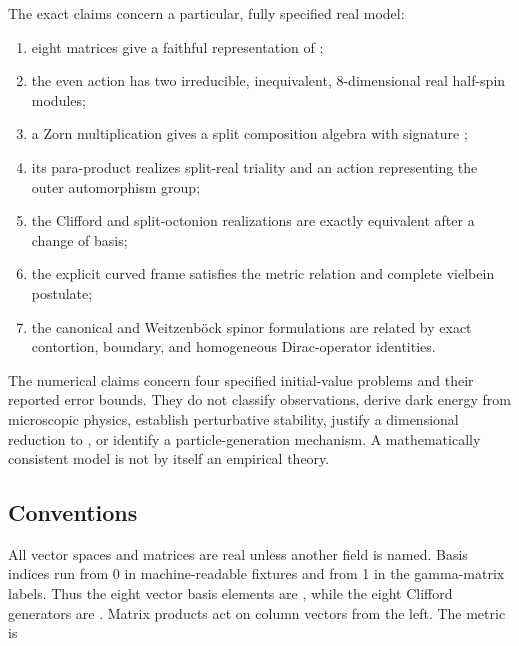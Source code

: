 \documentclass[11pt]{article}
\begin{document}
The exact claims concern a particular, fully specified real model:

\begin{enumerate}
\item eight matrices give a faithful representation of \texttt{};
\item the even action has two irreducible, inequivalent, 8-dimensional real
half-spin modules;

\item a Zorn multiplication gives a split composition algebra with signature
\texttt{};

\item its para-product realizes split-real triality and an \texttt{} action
representing the outer automorphism group;

\item the Clifford and split-octonion realizations are exactly equivalent after a
change of basis;

\item the explicit curved frame satisfies the metric relation and complete
vielbein postulate;

\item the canonical and Weitzenböck spinor formulations are related by exact
contortion, boundary, and homogeneous Dirac-operator identities.

\end{enumerate}

The numerical claims concern four specified initial-value problems and their reported error bounds. They do not classify observations, derive dark energy from microscopic physics, establish perturbative stability, justify a dimensional reduction to \texttt{}, or identify a particle-generation mechanism. A mathematically consistent model is not by itself an empirical theory.

\subsection{Conventions}

All vector spaces and matrices are real unless another field is named. Basis indices run from 0 in machine-readable fixtures and from 1 in the gamma-matrix labels. Thus the eight vector basis elements are \texttt{}, while the eight Clifford generators are \texttt{}. Matrix products act on column vectors from the left. The metric is
\end{document}
